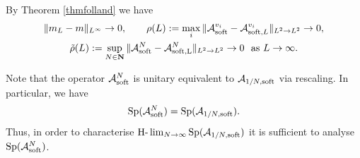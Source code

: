 \documentclass[11pt]{article}
\newcommand\soft{{\rm soft}}
\def\AA{\mathcal{A}}
\DeclareMathOperator{\Sp}{Sp}
\theoremstyle{remark}
\begin{document}
By Theorem \ref{thmfolland} we have
\begin{equation} \label{defeta}
	\begin{gathered}
		\|m_L-m\|_{L^\infty} \to 0,\qquad \rho(L):=\max_i \|\AA_\soft ^{v_i}-\mathcal{A}_{\soft,L}^{v_i}\|_{L^2 \to L^2} \to 0,
	\\
		\tilde{\rho}(L):=\sup_{N \in \mathbf{N}} \|\mathcal{A}^N_\soft-\mathcal{A}_{\rm soft,L}^N\|_{L^2 \to L^2} \to 0
		\ \ \hbox{as }L \to \infty.
	\end{gathered}
\end{equation}




Note that the operator $\AA_\soft^N$ is unitary equivalent to   $\AA_{1/N,\soft}$ via rescaling. In particular, we have
$$ \Sp (\mathcal{A}^N_\soft)=\Sp  (\mathcal{A}_{1/N,\rm soft}).$$
Thus, in order to characterise $\text{H-}\lim_{N \to \infty} \Sp (\AA_{1/N,\rm soft})$
it is sufficient to analyse $\Sp (\mathcal{A}^N_\soft)$.
\end{document}
